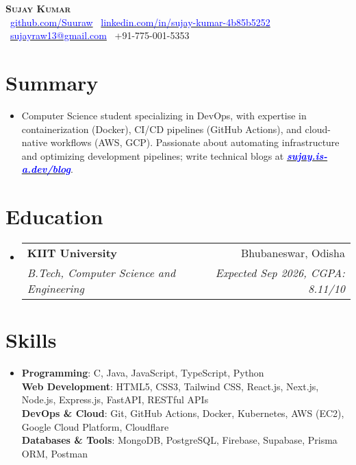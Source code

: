\documentclass[letterpaper,11pt]{article}
\makeatletter
\newcommand{\resumeSubheading}[4]{
  \vspace{-3pt}\item
  \begin{tabular*}{0.98\textwidth}[t]{l@{\extracolsep{\fill}}r}
    \textbf{#1} & #2 \\
    \textit{\small#3} & \textit{\small #4} \\
  \end{tabular*}\vspace{-6pt}
}
\newcommand{\resumeSubHeadingListStart}{\begin{itemize}[leftmargin=0.1in, label={}]}
\newcommand{\resumeSubHeadingListEnd}{\end{itemize}\vspace{-6pt}}
\makeatother
\begin{document}
\begin{center}
  \textbf{\Huge \scshape Sujay Kumar} \\ \vspace{8pt}
  \small
  \vspace{2pt}
  \faGithub\ \href{https://github.com/Suuraw}{\textcolor{blue}{github.com/Suuraw}} \quad
  \faLinkedin\ \href{https://linkedin.com/in/sujay-kumar-4b85b5252}{\textcolor{blue}{linkedin.com/in/sujay-kumar-4b85b5252}} \quad
  \faEnvelope\ \href{mailto:sujayraw13@gmail.com}{\textcolor{blue}{sujayraw13@gmail.com}} \quad
  \faPhone\ +91-775-001-5353
\end{center}
\vspace{-8pt}

\section{Summary}
\vspace{4pt}
\resumeSubHeadingListStart
\item{Computer Science student specializing in DevOps, with expertise in containerization (Docker), CI/CD pipelines (GitHub Actions), and cloud-native workflows (AWS, GCP). Passionate about automating infrastructure and optimizing development pipelines; write technical blogs at \href{https://sujay.is-a.dev/blog}{\textcolor{blue}{\textbf{\textit{sujay.is-a.dev/blog}}}}.}
\resumeSubHeadingListEnd

\section{Education}
\vspace{4pt}
\resumeSubHeadingListStart
  \resumeSubheading{KIIT University}{Bhubaneswar, Odisha}{B.Tech, Computer Science and Engineering}{Expected Sep 2026, CGPA: 8.11/10}
\resumeSubHeadingListEnd

\section{Skills}
\vspace{4pt}
\resumeSubHeadingListStart
  \item{
    \textbf{Programming}: C, Java, JavaScript, TypeScript, Python \\ \vspace{2pt}
    \textbf{Web Development}: HTML5, CSS3, Tailwind CSS, React.js, Next.js, Node.js, Express.js, FastAPI, RESTful APIs \\ \vspace{2pt}
    \textbf{DevOps \& Cloud}: Git, GitHub Actions, Docker, Kubernetes, AWS (EC2), Google Cloud Platform, Cloudflare \\ \vspace{2pt}
    \textbf{Databases \& Tools}: MongoDB, PostgreSQL, Firebase, Supabase, Prisma ORM, Postman
  }
\resumeSubHeadingListEnd
\end{document}
